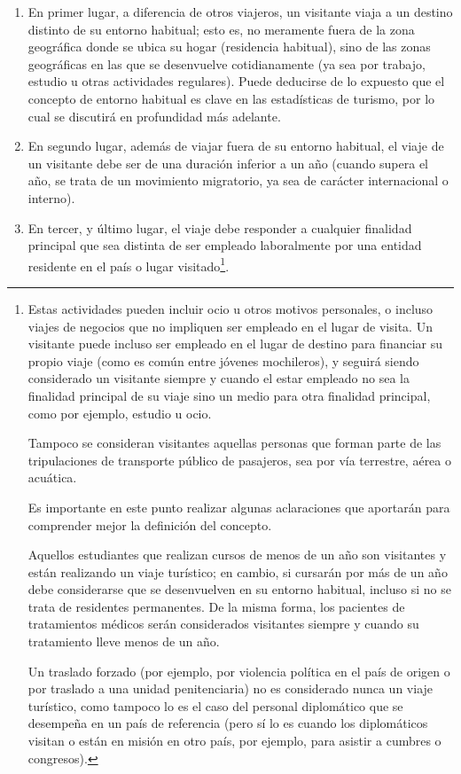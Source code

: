 \documentclass[
]{book}
\begin{document}
\begin{enumerate}
\def\labelenumi{\arabic{enumi}.}
\item
  En primer lugar, a diferencia de otros viajeros, un visitante viaja a un destino distinto de su entorno habitual; esto es, no meramente fuera de la zona geográfica donde se ubica su hogar (residencia habitual), sino de las zonas geográficas en las que se desenvuelve cotidianamente (ya sea por trabajo, estudio u otras actividades regulares). Puede deducirse de lo expuesto que el concepto de entorno habitual es clave en las estadísticas de turismo, por lo cual se discutirá en profundidad más adelante.
\item
  En segundo lugar, además de viajar fuera de su entorno habitual, el viaje de un visitante debe ser de una duración inferior a un año (cuando supera el año, se trata de un movimiento migratorio, ya sea de carácter internacional o interno).
\item
  En tercer, y último lugar, el viaje debe responder a cualquier finalidad principal que sea distinta de ser empleado laboralmente por una entidad residente en el país o lugar visitado\footnote{Estas actividades pueden incluir ocio u otros motivos personales, o incluso viajes de negocios que no impliquen ser empleado en el lugar de visita. Un visitante puede incluso ser empleado en el lugar de destino para financiar su propio viaje (como es común entre jóvenes mochileros), y seguirá siendo considerado un visitante siempre y cuando el estar empleado no sea la finalidad principal de su viaje sino un medio para otra finalidad principal, como por ejemplo, estudio u ocio.

    Tampoco se consideran visitantes aquellas personas que forman parte de las tripulaciones de transporte público de pasajeros, sea por vía terrestre, aérea o acuática.

    Es importante en este punto realizar algunas aclaraciones que aportarán para comprender mejor la definición del concepto.

    Aquellos estudiantes que realizan cursos de menos de un año son visitantes y están realizando un viaje turístico; en cambio, si cursarán por más de un año debe considerarse que se desenvuelven en su entorno habitual, incluso si no se trata de residentes permanentes. De la misma forma, los pacientes de tratamientos médicos serán considerados visitantes siempre y cuando su tratamiento lleve menos de un año.

    Un traslado forzado (por ejemplo, por violencia política en el país de origen o por traslado a una unidad penitenciaria) no es considerado nunca un viaje turístico, como tampoco lo es el caso del personal diplomático que se desempeña en un país de referencia (pero sí lo es cuando los diplomáticos visitan o están en misión en otro país, por ejemplo, para asistir a cumbres o congresos).}.
\end{enumerate}
\end{document}
